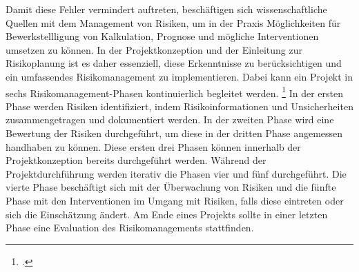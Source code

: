 Damit diese Fehler vermindert auftreten, beschäftigen sich wissenschaftliche Quellen mit dem Management von Risiken,
um in der Praxis Möglichkeiten für Bewerkstellligung von Kalkulation, Prognose und mögliche Interventionen umsetzen zu können.
In der Projektkonzeption und der Einleitung zur Risikoplanung ist es daher essenziell, diese Erkenntnisse zu berücksichtigen
und ein umfassendes Risikomanagement zu implementieren. Dabei kann ein Projekt in sechs Risikomanagement-Phasen kontinuierlich begleitet werden.
\footcite[Vgl.][45]{dikmenLearningRisksTool2008}
In der ersten Phase werden Risiken identifiziert, indem Risikoinformationen und Unsicherheiten zusammengetragen und dokumentiert werden.
In der zweiten Phase wird eine Bewertung der Risiken durchgeführt, um diese in der dritten Phase angemessen handhaben zu können.
Diese ersten drei Phasen können innerhalb der Projektkonzeption bereits durchgeführt werden.
Während der Projektdurchführung werden iterativ die Phasen vier und fünf durchgeführt. Die vierte
Phase beschäftigt sich mit der Überwachung von Risiken und die fünfte Phase mit den Interventionen im
Umgang mit Risiken, falls diese eintreten oder sich die Einschätzung ändert. Am Ende eines Projekts
sollte in einer letzten Phase eine Evaluation des Risikomanagements stattfinden.

